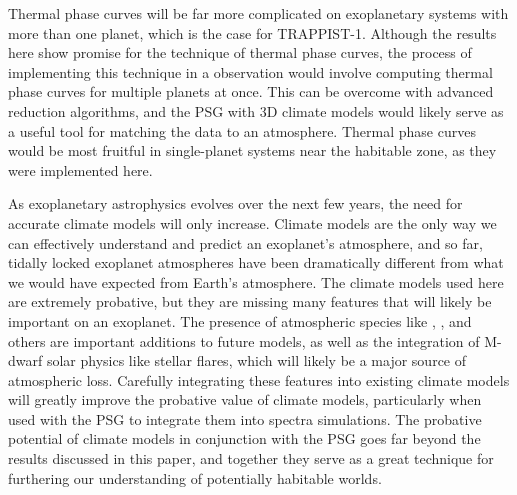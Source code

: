 Thermal phase curves will be far more complicated on exoplanetary systems
 with more than one planet, which is the case for TRAPPIST-1. Although the
 results here show promise for the technique of thermal phase curves, the process
 of implementing this technique in a observation would involve computing thermal
 phase curves for multiple planets at once. This can be overcome with advanced
 reduction algorithms, and the PSG with 3D climate models would likely serve as
 a useful tool for matching the data to an atmosphere. Thermal phase curves
 would be most fruitful in single-planet systems near the habitable zone, as
 they were implemented here.

As exoplanetary astrophysics evolves over the next few years, the need for
 accurate climate models will only increase. Climate models are the only way we
 can effectively understand and predict an exoplanet's atmosphere, and so far,
 tidally locked exoplanet atmospheres have been dramatically different from
 what we would have expected from Earth's atmosphere. The climate models used
 here are extremely probative, but they are missing many features that will likely
 be important on an exoplanet. The presence of atmospheric species like
 , , and others are important additions to future models,
 as well as the integration of M-dwarf solar physics like stellar flares, which
 will likely be a major source of atmospheric loss. Carefully integrating these
 features into existing climate models will greatly improve the probative value
 of climate models, particularly when used with the PSG to integrate them into
 spectra simulations. The probative potential of climate models in conjunction
 with the PSG goes far beyond the results discussed in this paper, and together
 they serve as a great technique for furthering our understanding of potentially
 habitable worlds.